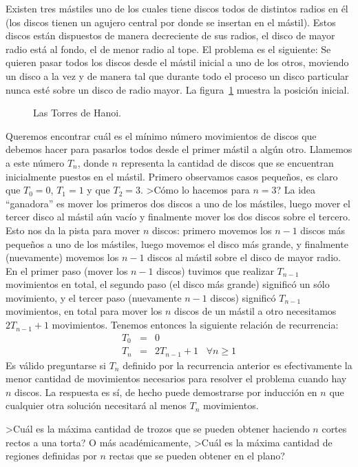 \begin{ejemplo}
Existen tres mástiles uno de los cuales tiene discos todos de distintos radios en él (los discos tienen un agujero central por donde se insertan en el mástil).
Estos discos están dispuestos de manera decreciente de sus radios, el disco de mayor radio está al fondo, el de menor radio al tope.
El problema es el siguiente: Se quieren pasar todos los discos desde el mástil inicial a uno de los otros, moviendo un disco a la vez y de manera tal que durante todo el proceso un disco particular nunca esté sobre un disco de radio mayor.
La figura~\ref{hanoi} muestra la posición inicial.

\begin{figure}[h!]
\caption{Las Torres de Hanoi.}
\label{hanoi}
\end{figure}

Queremos encontrar cuál es el mínimo número movimientos de discos que debemos hacer para pasarlos todos desde el primer mástil a algún otro.
Llamemos a este número $T_n$, donde $n$ representa la cantidad de discos que se encuentran inicialmente puestos en el mástil.
Primero observamos casos pequeños, es claro que $T_0=0$, $T_1=1$ y que $T_2=3$.
>Cómo lo hacemos para $n=3$?
La idea ``ganadora'' es mover los primeros dos discos a uno de los mástiles, luego mover el tercer disco al mástil aún vacío y finalmente mover los dos discos sobre el tercero.
Esto nos da la pista para mover $n$ discos: primero movemos los $n-1$ discos más pequeños a uno de los mástiles, luego movemos el disco más grande, y finalmente (nuevamente) movemos los $n-1$ discos al mástil sobre el disco de mayor radio.
En el primer paso (mover los $n-1$ discos) tuvimos que realizar $T_{n-1}$ movimientos en total, el segundo paso (el disco más grande) significó un sólo movimiento, y el tercer paso (nuevamente $n-1$ discos) significó $T_{n-1}$ movimientos, en total para mover los $n$ discos de un mástil a otro necesitamos $2T_{n-1}+1$ movimientos.
Tenemos entonces la siguiente relación de recurrencia:
\[
\begin{array}{rcl}
T_0 & = & 0 \\
T_n & = & 2T_{n-1} + 1 \;\;\;\forall n\geq 1
\end{array}
\]
Es válido preguntarse si $T_n$ definido por la recurrencia anterior es efectivamente la menor cantidad de movimientos necesarios para resolver el problema cuando hay $n$ discos.
La respuesta es sí, de hecho puede demostrarse por inducción en $n$ que cualquier otra solución necesitará al menos $T_n$ movimientos.
\end{ejemplo}

\begin{ejemplo}
>Cuál es la máxima cantidad de trozos que se pueden obtener haciendo $n$ cortes rectos a una torta?
O más académicamente, >Cuál es la máxima cantidad de regiones definidas por $n$ rectas que se pueden obtener en el plano?
\end{ejemplo}



